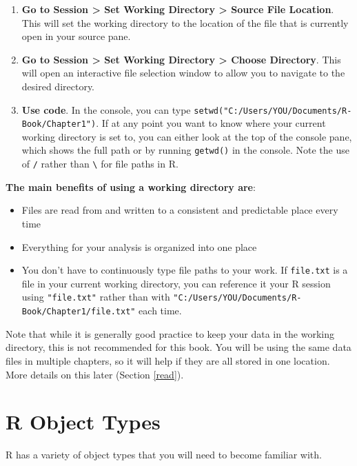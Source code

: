 \documentclass[]{book}
\providecommand{\tightlist}{%
  \setlength{\itemsep}{0pt}\setlength{\parskip}{0pt}}
\theoremstyle{definition}
\theoremstyle{definition}
\theoremstyle{definition}
\theoremstyle{remark}
\begin{document}
\begin{enumerate}
\def\labelenumi{\arabic{enumi}.}
\item
  \textbf{Go to Session \textgreater{} Set Working Directory
  \textgreater{} Source File Location}. This will set the working
  directory to the location of the file that is currently open in your
  source pane.
\item
  \textbf{Go to Session \textgreater{} Set Working Directory
  \textgreater{} Choose Directory}. This will open an interactive file
  selection window to allow you to navigate to the desired directory.
\item
  \textbf{Use code}. In the console, you can type
  \texttt{setwd("C:/Users/YOU/Documents/R-Book/Chapter1")}. If at any
  point you want to know where your current working directory is set to,
  you can either look at the top of the console pane, which shows the
  full path or by running \texttt{getwd()} in the console. Note the use
  of \texttt{/} rather than \texttt{\textbackslash{}} for file paths in
  R.
\end{enumerate}

\textbf{The main benefits of using a working directory are}:

\begin{itemize}
\tightlist
\item
  Files are read from and written to a consistent and predictable place
  every time
\item
  Everything for your analysis is organized into one place
\item
  You don't have to continuously type file paths to your work. If
  \texttt{file.txt} is a file in your current working directory, you can
  reference it your R session using \texttt{"file.txt"} rather than with
  \texttt{"C:/Users/YOU/Documents/R-Book/Chapter1/file.txt"} each time.
\end{itemize}

Note that while it is generally good practice to keep your data in the
working directory, this is not recommended for this book. You will be
using the same data files in multiple chapters, so it will help if they
are all stored in one location. More details on this later (Section
\ref{read}).

\section{R Object Types}\label{r-object-types}

R has a variety of object types that you will need to become familiar
with.
\end{document}

